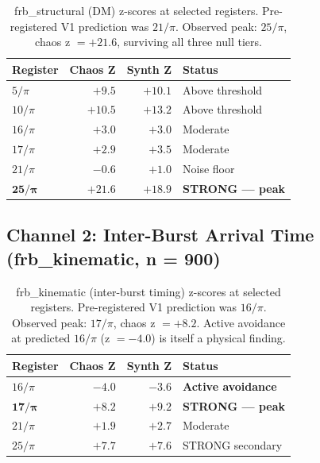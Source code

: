 \documentclass[11pt, letterpaper, openany]{book}
\begin{document}
\begin{table}[H]
\centering
\renewcommand{\arraystretch}{1.4}
\small
\begin{tabular}{|l|r|r|l|}
\hline
\rowcolor{kishblue!10}
\textbf{Register} & \textbf{Chaos Z} & \textbf{Synth Z} & \textbf{Status} \\
\hline\hline
$5/\pi$  & $+9.5$  & $+10.1$ & Above threshold \\
$10/\pi$ & $+10.5$ & $+13.2$ & Above threshold \\
$16/\pi$ & $+3.0$  & $+3.0$  & Moderate \\
$17/\pi$ & $+2.9$  & $+3.5$  & Moderate \\
$21/\pi$ & $-0.6$  & $+1.0$  & Noise floor \\
$\mathbf{25/\pi}$ & $\mathbf{+21.6}$ & $\mathbf{+18.9}$ &
  \textbf{STRONG --- peak} \\
\hline
\end{tabular}
\caption{frb\_structural (DM) z-scores at selected registers.
Pre-registered V1 prediction was $21/\pi$. Observed peak: $25/\pi$,
chaos z $= +21.6$, surviving all three null tiers.}
\end{table}

\subsection*{Channel 2: Inter-Burst Arrival Time (frb\_kinematic, n = 900)}

\begin{table}[H]
\centering
\renewcommand{\arraystretch}{1.4}
\small
\begin{tabular}{|l|r|r|l|}
\hline
\rowcolor{kishblue!10}
\textbf{Register} & \textbf{Chaos Z} & \textbf{Synth Z} & \textbf{Status} \\
\hline\hline
$16/\pi$ & $-4.0$ & $-3.6$ & \textbf{Active avoidance} \\
$\mathbf{17/\pi}$ & $\mathbf{+8.2}$ & $\mathbf{+9.2}$ &
  \textbf{STRONG --- peak} \\
$21/\pi$ & $+1.9$ & $+2.7$ & Moderate \\
$25/\pi$ & $+7.7$ & $+7.6$ & STRONG secondary \\
\hline
\end{tabular}
\caption{frb\_kinematic (inter-burst timing) z-scores at selected registers.
Pre-registered V1 prediction was $16/\pi$. Observed peak: $17/\pi$,
chaos z $= +8.2$. Active avoidance at predicted $16/\pi$ (z $= -4.0$)
is itself a physical finding.}
\end{table}
\end{document}
